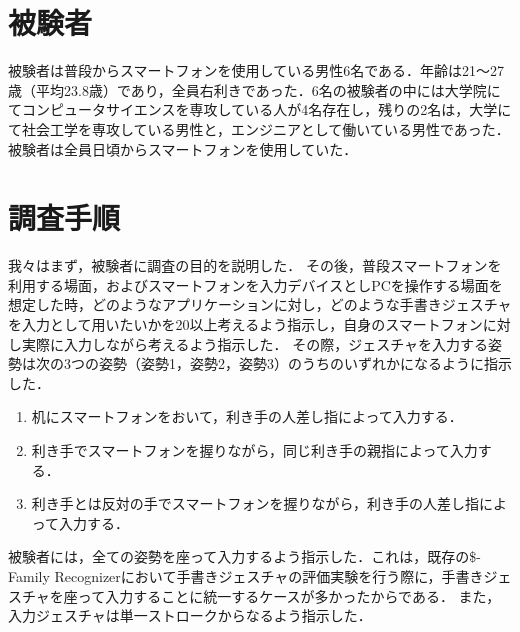 \section{被験者}
被験者は普段からスマートフォンを使用している男性6名である．年齢は21〜27歳（平均23.8歳）であり，全員右利きであった．6名の被験者の中には大学院にてコンピュータサイエンスを専攻している人が4名存在し，残りの2名は，大学にて社会工学を専攻している男性と，エンジニアとして働いている男性であった．被験者は全員日頃からスマートフォンを使用していた．



\section{調査手順}
我々はまず，被験者に調査の目的を説明した．
その後，普段スマートフォンを利用する場面，およびスマートフォンを入力デバイスとしPCを操作する場面を想定した時，どのようなアプリケーションに対し，どのような手書きジェスチャを入力として用いたいかを20以上考えるよう指示し，自身のスマートフォンに対し実際に入力しながら考えるよう指示した．
その際，ジェスチャを入力する姿勢は次の3つの姿勢（姿勢1，姿勢2，姿勢3）のうちのいずれかになるように指示した．
\begin{enumerate}
\item 机にスマートフォンをおいて，利き手の人差し指によって入力する．
\item 利き手でスマートフォンを握りながら，同じ利き手の親指によって入力する．
\item 利き手とは反対の手でスマートフォンを握りながら，利き手の人差し指によって入力する．
\end{enumerate}
被験者には，全ての姿勢を座って入力するよう指示した．これは，既存の\$-Family Recognizerにおいて手書きジェスチャの評価実験を行う際に，手書きジェスチャを座って入力することに統一するケースが多かったからである．
また，入力ジェスチャは単一ストロークからなるよう指示した．

